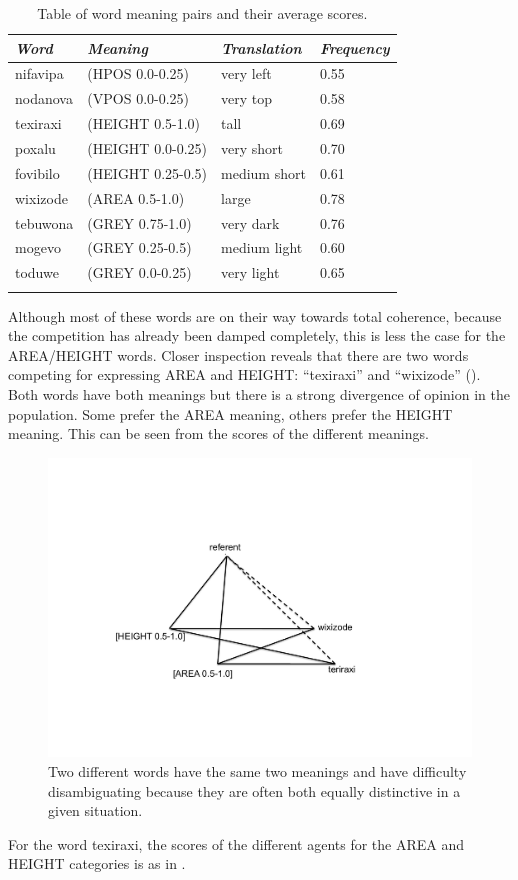\begin{table}
\begin{center}
\begin{tabular}{ l  l  l  l }
\lsptoprule
{\itshape Word}&{\itshape Meaning}& {\itshape Translation} & {\itshape Frequency} \\ \midrule
nifavipa & (HPOS 0.0-0.25) & very left & 0.55 \\ 
nodanova & (VPOS 0.0-0.25) & very top & 0.58  \\ 
texiraxi & (HEIGHT 0.5-1.0) & tall & 0.69  \\ 
poxalu & (HEIGHT 0.0-0.25) & very short & 0.70  \\ 
fovibilo & (HEIGHT 0.25-0.5) & medium short & 0.61  \\ 
wixizode & (AREA 0.5-1.0) & large & 0.78  \\ 
tebuwona & (GREY 0.75-1.0) & very dark & 0.76  \\ 
mogevo & (GREY 0.25-0.5) & medium light & 0.60  \\ 
toduwe & (GREY 0.0-0.25) & very light & 0.65  \\ 
\lspbottomrule
\end{tabular}
\caption{\label{tab:freq} Table of word meaning pairs and their average scores.}
\end{center}
\end{table}
Although most of these words are on their way towards
total coherence, because the competition has already 
been damped completely, this is less the case for 
the AREA/HEIGHT words. Closer inspection reveals that 
there are two words competing for expressing
AREA and HEIGHT: ``texiraxi'' and ``wixizode''
(). Both words have both meanings
but there is a strong divergence of opinion in the 
population. Some prefer the AREA meaning, others prefer
the HEIGHT meaning. This can be seen from the scores of 
the different meanings.


\begin{figure}[htbp]
  \centerline{\includegraphics[width=.60\textwidth]{chap6/figs/triangle7}}
\caption{\label{triangle7} Two different words have the 
same two meanings and have difficulty disambiguating because
they are often both equally distinctive in a given situation.}
\end{figure}
For the word texiraxi, the scores of the different 
agents for the AREA and HEIGHT categories is as in . 


